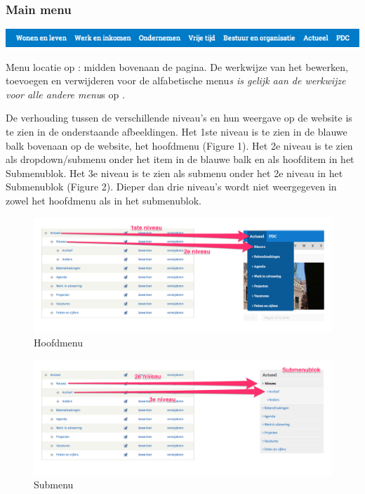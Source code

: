\bigskip

\subsubsection{Main menu}\label{mainmenu}

\begin{center}
	\includegraphics[width=\textwidth]{img/menu_main.png}
\end{center}

Menu locatie op \drupalpath{}: midden bovenaan de pagina. De werkwijze van het bewerken, toevoegen en verwijderen voor de alfabetische menu\emph{s is gelijk aan de werkwijze voor alle andere menu}s op \drupalpath{}. 

De verhouding tussen de verschillende niveau's en hun weergave op de website is te zien in de onderstaande afbeeldingen. Het 1ste niveau is te zien in de blauwe balk bovenaan op de website, het hoofdmenu (Figure 1). Het 2e niveau is te zien als dropdown/submenu onder het item in de blauwe balk en als hoofditem in het Submenublok. Het 3e niveau is te zien als submenu onder het 2e niveau in het Submenublok (Figure 2). Dieper dan drie niveau's wordt niet weergegeven in zowel het hoofdmenu als in het submenublok.

\begin{figure}[h!]
  \includegraphics[width=\textwidth]{img/menu_mainmenu.png}
  \caption{Hoofdmenu}
\end{figure}

\begin{figure}[h!]
  \includegraphics[width=\textwidth]{img/menu_submenu.png}
  \caption{Submenu}
\end{figure}

